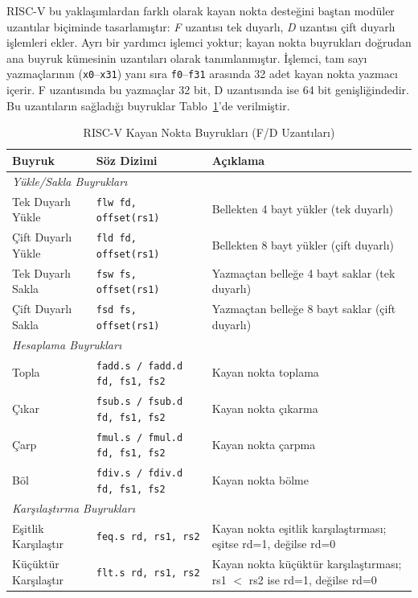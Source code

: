 RISC-V bu yaklaşımlardan farklı olarak kayan nokta desteğini baştan modüler uzantılar biçiminde tasarlamıştır: \emph{F} uzantısı tek duyarlı, \emph{D} uzantısı çift duyarlı işlemleri ekler. Ayrı bir yardımcı işlemci yoktur; kayan nokta buyrukları doğrudan ana buyruk kümesinin uzantıları olarak tanımlanmıştır. İşlemci, tam sayı yazmaçlarının (\texttt{x0}--\texttt{x31}) yanı sıra \texttt{f0}--\texttt{f31} arasında 32 adet kayan nokta yazmacı içerir. F uzantısında bu yazmaçlar 32 bit, D uzantısında ise 64 bit genişliğindedir. Bu uzantıların sağladığı buyruklar Tablo~\ref{tab:kayan-nokta-buyruklar}'de verilmiştir.

\begin{table}[htbp]
\centering
\caption{RISC-V Kayan Nokta Buyrukları (F/D Uzantıları)}
\label{tab:kayan-nokta-buyruklar}
\small
\begin{tabularx}{\textwidth}{l l X}
\toprule
\textbf{Buyruk} & \textbf{Söz Dizimi} & \textbf{Açıklama} \\
\midrule
\multicolumn{3}{l}{\textit{Yükle/Sakla Buyrukları}} \\
\midrule
Tek Duyarlı Yükle & \texttt{flw fd, offset(rs1)} & Bellekten 4 bayt yükler (tek duyarlı) \\
Çift Duyarlı Yükle & \texttt{fld fd, offset(rs1)} & Bellekten 8 bayt yükler (çift duyarlı) \\
Tek Duyarlı Sakla & \texttt{fsw fs, offset(rs1)} & Yazmaçtan belleğe 4 bayt saklar (tek duyarlı) \\
Çift Duyarlı Sakla & \texttt{fsd fs, offset(rs1)} & Yazmaçtan belleğe 8 bayt saklar (çift duyarlı) \\
\midrule
\multicolumn{3}{l}{\textit{Hesaplama Buyrukları}} \\
\midrule
Topla & \texttt{fadd.s / fadd.d fd, fs1, fs2} & Kayan nokta toplama \\
Çıkar & \texttt{fsub.s / fsub.d fd, fs1, fs2} & Kayan nokta çıkarma \\
Çarp & \texttt{fmul.s / fmul.d fd, fs1, fs2} & Kayan nokta çarpma \\
Böl & \texttt{fdiv.s / fdiv.d fd, fs1, fs2} & Kayan nokta bölme \\
\midrule
\multicolumn{3}{l}{\textit{Karşılaştırma Buyrukları}} \\
\midrule
Eşitlik Karşılaştır & \texttt{feq.s rd, rs1, rs2} & Kayan nokta eşitlik karşılaştırması; eşitse rd=1, değilse rd=0 \\
Küçüktür Karşılaştır & \texttt{flt.s rd, rs1, rs2} & Kayan nokta küçüktür karşılaştırması; rs1 $<$ rs2 ise rd=1, değilse rd=0 \\

\end{tabularx}
\end{table}
